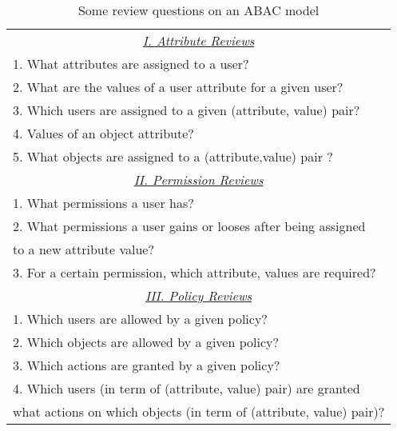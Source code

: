 \begin{table}
	\centering
	\caption{Some review questions on an ABAC model} %
	\label{tab:review-functions-example}
	\begin{tabular}{|l|}						
		\hline					
		\multicolumn{1}{|c|}{\underline{\textit{I. Attribute Reviews }}}\\				 
		
			 1. What attributes are assigned to a user? \\
			 2. What are the values of a user attribute for a given user? \\
			 3. Which users are assigned to a given (attribute, value) pair? \\
			 4. Values of an object attribute? \\
			 5. What objects are assigned to a (attribute,value) pair ? \\
			 
		\multicolumn{1}{|c|}{\underline{\textit{II. Permission Reviews}}} \\		
		
	     	1. What permissions a user has? \\
	     	2. What permissions a user gains or looses after being assigned  \\ \hfil to a new attribute value? \\	     	 
	     	3. For a  certain permission, which attribute, values are required? \\
	     	
		\multicolumn{1}{|c|}{\underline{\textit{III. Policy Reviews}}} \\
		
			 1. Which users are allowed by a given policy? \\
			 2. Which objects are allowed by a given policy? \\
			 3. Which actions are granted by a given policy?\\
			 4. Which users (in term of (attribute, value) pair) are granted \\ \hfil what actions  on which objects (in term of (attribute, value) pair)?
		\\ \hline	
	\end{tabular}	
\end{table}
